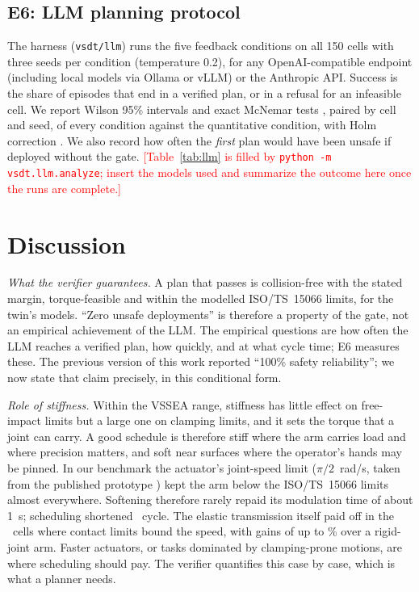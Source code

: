 \documentclass[journal]{IEEEtran}
\newcommand{\todo}[1]{\textcolor{red}{[#1]}}
\begin{document}
\subsection{E6: LLM planning protocol}
The harness (\texttt{vsdt/llm}) runs the five feedback conditions on all 150 cells with three seeds per condition (temperature 0.2), for any OpenAI-compatible endpoint (including local models via Ollama or vLLM) or the Anthropic API. Success is the share of episodes that end in a verified plan, or in a refusal for an infeasible cell. We report Wilson 95\% intervals \cite{wilson1927} and exact McNemar tests \cite{mcnemar1947}, paired by cell and seed, of every condition against the quantitative condition, with Holm correction \cite{holm1979}. We also record how often the \emph{first} plan would have been unsafe if deployed without the gate. \todo{Table~\ref{tab:llm} is filled by \texttt{python -m vsdt.llm.analyze}; insert the models used and summarize the outcome here once the runs are complete.}

\begin{table}[t]
\caption{LLM planning results (95\% Wilson intervals)}\label{tab:llm}
\centering\scriptsize
\IfFileExists{llm_table.tex}{\resizebox{\columnwidth}{!}{}}{\todo{run the LLM harness}}
\end{table}

\section{Discussion}\label{sec:discussion}
\emph{What the verifier guarantees.} A plan that passes is collision-free with the stated margin, torque-feasible and within the modelled ISO/TS~15066 limits, for the twin's models. ``Zero unsafe deployments'' is therefore a property of the gate, not an empirical achievement of the LLM. The empirical questions are how often the LLM reaches a verified plan, how quickly, and at what cycle time; E6 measures these. The previous version of this work reported ``100\% safety reliability''; we now state that claim precisely, in this conditional form.

\emph{Role of stiffness.} Within the VSSEA range, stiffness has little effect on free-impact limits but a large one on clamping limits, and it sets the torque that a joint can carry. A good schedule is therefore stiff where the arm carries load and where precision matters, and soft near surfaces where the operator's hands may be pinned. In our benchmark the actuator's joint-speed limit ($\pi/2$~rad/s, taken from the published prototype \cite{sariyildiz2023}) kept the arm below the ISO/TS~15066 limits almost everywhere. Softening therefore rarely repaid its modulation time of about \SI{1}{s}; scheduling shortened \nSchedFaster\ cycle. The elastic transmission itself paid off in the \nBound\ cells where contact limits bound the speed, with gains of up to \boundGainMax\% over a rigid-joint arm. Faster actuators, or tasks dominated by clamping-prone motions, are where scheduling should pay. The verifier quantifies this case by case, which is what a planner needs.
\end{document}
